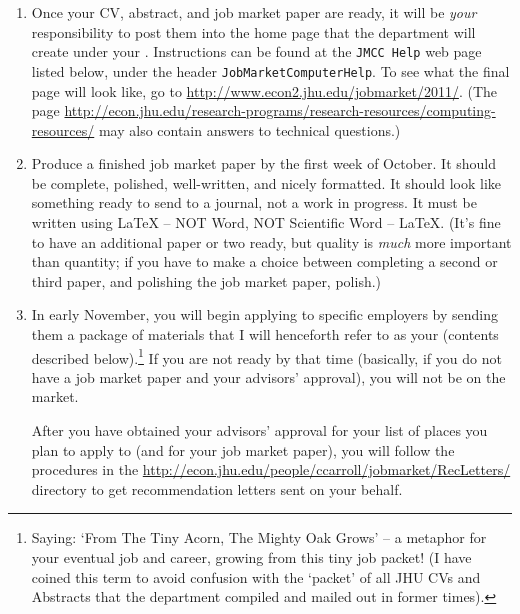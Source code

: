\documentclass{econtex}
\begin{document}
\begin{enumerate}
\item Once your CV, abstract, and job market paper are ready, it will
  be {\it your} responsibility to post them into the home page that
  the department will create under your \Moniker.
  Instructions can be found at the \texttt{JMCC Help} web page listed
  below, under the header \texttt{JobMarketComputerHelp}.  To see what
  the final page will look like, go to
  \url{http://www.econ2.jhu.edu/jobmarket/2011/}.  (The page
  \url{http://econ.jhu.edu/research-programs/research-resources/computing-resources/}
  may also contain answers to technical questions.)

\item Produce a finished job market paper by the first week of October.  It should
  be complete, polished, well-written, and nicely formatted.  It
  should look like something ready to send to a journal, not a work in
  progress.  It must be written using {\LaTeX} -- NOT Word, NOT Scientific Word -- {\LaTeX}.  (It's fine to have an
  additional paper or two ready, but quality is {\it much} more
  important than quantity; if you have to make a choice between completing a second or third paper, and 
polishing the job market paper, polish.)
  
\item In early November, you will begin applying to specific employers
  by sending them a package of materials that I will henceforth refer
  to as your {\Acorn} (contents described below).\footnote{Saying: `From
    The Tiny Acorn, The Mighty Oak Grows' -- a metaphor for your eventual
    job and career, growing from this tiny job packet! (I have coined
    this term to avoid confusion with the `packet' of all JHU CVs and Abstracts that the department compiled and mailed out in former times).}  If you are not
  ready by that time (basically, if you do not have a job market paper
  and your advisors' approval), you will not be on the market.
  
  After you have obtained your advisors' approval for your list of
  places you plan to apply to (and for your job market paper), you
  will follow the procedures in the
  \url{http://econ.jhu.edu/people/ccarroll/jobmarket/RecLetters/}
  directory to get recommendation letters sent on your behalf.


\end{enumerate}
\end{document}
